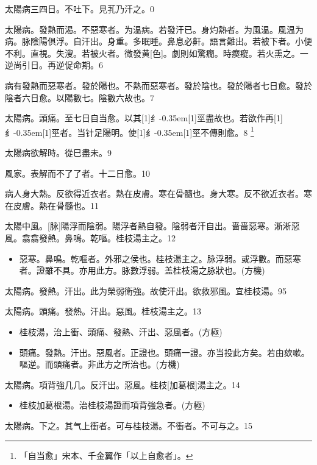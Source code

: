 \documentclass[oneside,b4paper]{ctexbook}
\begin{document}
\begin{flushleft}
太陽病三四日。不吐下。見芤乃汗之。0

太陽病。發熱而渴。不惡寒者。为温病。若發汗已。身灼熱者。为風温。風温为病。脉陰陽俱浮。自汗出。身重。多眠睡。鼻息必鼾。語言難出。若被下者。小便不利。直視。失溲。若被火者。微發黄[色]。劇則如驚癇。時瘈瘲。若火熏之。一逆尚引日。再逆促命期。6

病有發熱而惡寒者。發於陽也。不熱而惡寒者。發於陰也。發於陽者七日愈。發於陰者六日愈。以陽數七。陰數六故也。7

太陽病。頭痛。至七日自当愈。以其{\hbox{\scalebox{0.68}[1]{纟}\kern-0.35em\scalebox{0.64}[1]{巠}}}盡故也。若欲作再{\hbox{\scalebox{0.68}[1]{纟}\kern-0.35em\scalebox{0.64}[1]{巠}}}者。当针足陽明。使{\hbox{\scalebox{0.68}[1]{纟}\kern-0.35em\scalebox{0.64}[1]{巠}}}不傳則愈。8
\footnote{「自当愈」宋本、千金翼作「以上自愈者」。}

太陽病欲解時。從巳盡未。9

風家。表解而不了了者。十二日愈。10

病人身大熱。反欲得近衣者。熱在皮膚。寒在骨髓也。身大寒。反不欲近衣者。寒在皮膚。熱在骨髓也。11

太陽中風。[脉]陽浮而陰弱。陽浮者熱自發。陰弱者汗自出。啬啬惡寒。淅淅惡風。翕翕發熱。鼻鳴。乾嘔。桂枝湯主之。12

\begin{itemize}
\item 惡寒。鼻鳴。乾嘔者。外邪之侯也。桂枝湯主之。脉浮弱。或浮數。而惡寒者。證雖不具。亦用此方。脉數浮弱。盖桂枝湯之脉狀也。(方機)
\end{itemize}

太陽病。發熱。汗出。此为榮弱衛強。故使汗出。欲救邪風。宜桂枝湯。95

太陽病。頭痛。發熱。汗出。惡風。桂枝湯主之。13

\begin{itemize}
\item 桂枝湯，治上衝、頭痛、發熱、汗出、惡風者。(方極)
\item 頭痛。發熱。汗出。惡風者。正證也。頭痛一證。亦当投此方矣。若由欬嗽。嘔逆。而頭痛者。非此方之所治也。(方機)
\end{itemize}

太陽病。項背強几几。反汗出。惡風。桂枝[加葛根]湯主之。14

\begin{itemize}
\item 桂枝加葛根湯。治桂枝湯證而項背強急者。(方極)
\end{itemize}

太陽病。下之。其气上衝者。可与桂枝湯。不衝者。不可与之。15


\end{flushleft}
\end{document}
